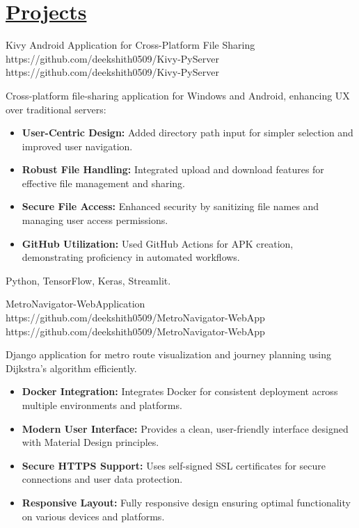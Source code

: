 \documentclass[a4paper,10pt]{article}
\begin{document}
\section{ \href{https://github.com/deekshith0509?tab=repositories}{Projects}}
\vspace{0pt}
\projectentry
{Kivy Android Application for Cross-Platform File Sharing}
{https://github.com/deekshith0509/Kivy-PyServer}
{https://github.com/deekshith0509/Kivy-PyServer}
{Cross-platform file-sharing application for Windows and Android, enhancing UX over traditional servers:
\begin{itemize}
    \item \textbf{User-Centric Design:} Added directory path input for simpler selection and improved user navigation.
    \item \textbf{Robust File Handling:} Integrated upload and download features for effective file management and sharing.
    \item \textbf{Secure File Access:} Enhanced security by sanitizing file names and managing user access permissions.
    \item \textbf{GitHub Utilization:} Used GitHub Actions for APK creation, demonstrating proficiency in automated workflows.
\end{itemize}}{Python, TensorFlow, Keras, Streamlit.}



\vspace{10pt}

\projectentry
{MetroNavigator-WebApplication}
{https://github.com/deekshith0509/MetroNavigator-WebApp}
{https://github.com/deekshith0509/MetroNavigator-WebApp}
{Django application for metro route visualization and journey planning using Dijkstra's algorithm efficiently.
\begin{itemize}
    \item \textbf{Docker Integration:} Integrates Docker for consistent deployment across multiple environments and platforms.
    \item \textbf{Modern User Interface:} Provides a clean, user-friendly interface designed with Material Design principles.
    \item \textbf{Secure HTTPS Support:} Uses self-signed SSL certificates for secure connections and user data protection.
    \item \textbf{Responsive Layout:} Fully responsive design ensuring optimal functionality on various devices and platforms.
\end{itemize}}
\end{document}
